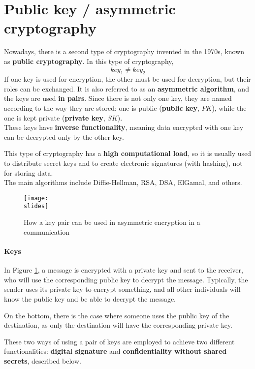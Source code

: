 \newpage
\section{Public key / asymmetric cryptography}

Nowadays, there is a second type of cryptography invented in the 1970s, known as \textbf{public cryptography}. In this type of cryptography, \[key_1 \neq key_2\]
If one key is used for encryption, the other must be used for decryption, but their roles can be exchanged.
It is also referred to as an \textbf{asymmetric algorithm}, and the keys are used \textbf{in pairs}. Since there is not only one key, they are named according to the way they are stored: one is public (\textbf{public key}, $PK$), while the one is kept private (\textbf{private key}, $SK$). \\
These keys have \textbf{inverse functionality}, meaning data encrypted with one key can be decrypted only by the other key.

This type of cryptography has a \textbf{high computational load}, so it is usually used to distribute secret keys and to create electronic signatures (with hashing), not for storing data. \\
The main algorithms include Diffie-Hellman, RSA, DSA, ElGamal, and others.

\begin{figure}[h]
    \centering
    \texttt{[image: \\slides]}
    \caption{How a key pair can be used in asymmetric encryption in a communication}
    \label{fig:asymmcrypto}
\end{figure}

\paragraph*{Keys}

In Figure \ref*{fig:asymmcrypto}, a message is encrypted with a private key and sent to the receiver, who will use the corresponding public key to decrypt the message. Typically, the sender uses its private key to encrypt something, and all other individuals will know the public key and be able to decrypt the message.

On the bottom, there is the case where someone uses the public key of the destination, as only the destination will have the corresponding private key.

These two ways of using a pair of keys are employed to achieve two different functionalities: \textbf{digital signature} and \textbf{confidentiality without shared secrets}, described below.




